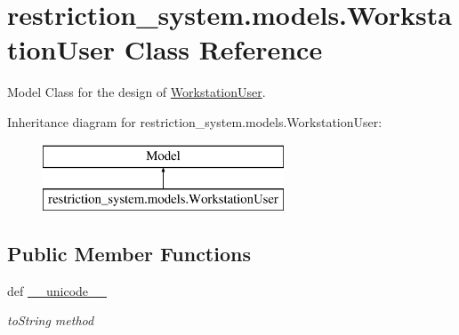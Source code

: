 \hypertarget{classrestriction__system_1_1models_1_1WorkstationUser}{}\section{restriction\+\_\+system.\+models.\+Workstation\+User Class Reference}
\label{classrestriction__system_1_1models_1_1WorkstationUser}


Model Class for the design of \hyperlink{classrestriction__system_1_1models_1_1WorkstationUser}{Workstation\+User}.  


Inheritance diagram for restriction\+\_\+system.\+models.\+Workstation\+User\+:\begin{figure}[H]
\begin{center}
\leavevmode
\includegraphics[height=2.000000cm]{classrestriction__system_1_1models_1_1WorkstationUser}
\end{center}
\end{figure}
\subsection*{Public Member Functions}
\begin{DoxyCompactItemize}
\item 
def \hyperlink{classrestriction__system_1_1models_1_1WorkstationUser_a3fb66c1003b50dff7a997231940aec37}{\+\_\+\+\_\+unicode\+\_\+\+\_\+}
\begin{DoxyCompactList}\small\item\em to\+String method \end{DoxyCompactList}\end{DoxyCompactItemize}
